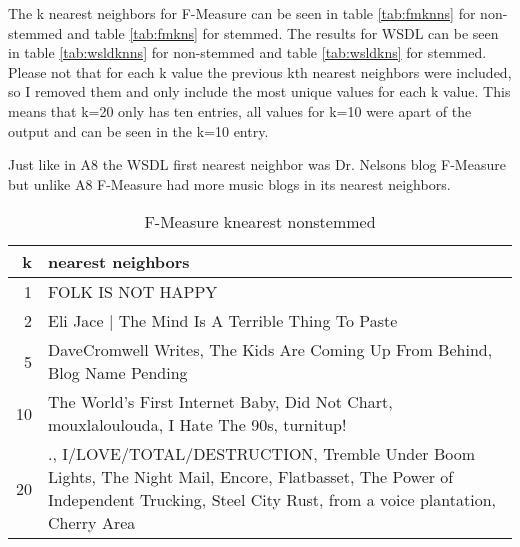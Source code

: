 \documentclass[letterpaper,10pt]{article}
\begin{document}
The k nearest neighbors for F-Measure can be seen in table \hyperref[tab:fmknns]{\ref{tab:fmknns}} for non-stemmed and table \hyperref[tab:fmkns]{\ref{tab:fmkns}} for stemmed. The results for WSDL can be seen in table \hyperref[tab:wsldknns]{\ref{tab:wsldknns}} for non-stemmed and table \hyperref[tab:wsldkns]{\ref{tab:wsldkns}} for stemmed. Please not that for each k value the previous kth nearest neighbors were included, so I removed them and only include the most unique values for each k value. This means that k=20 only has ten entries, all values for k=10 were apart of the output and can be seen in the k=10 entry.

Just like in A8 the WSDL first nearest neighbor was Dr. Nelsons blog F-Measure but unlike A8 F-Measure had more music blogs in its nearest neighbors.

\begin{table}[H]
\centering
\setlength\tabcolsep{2pt}
\begin{minipage}{0.48\textwidth}
\centering
\begin{tabular}{rp{5cm}}
\hline
   k & nearest neighbors                                                                                                                                                                    \\
\hline
   1 & FOLK IS NOT HAPPY                                                                                                                                                                    \\ \hline
   2 & Eli Jace | The Mind Is A Terrible Thing To Paste                                                                                                                                     \\ \hline
   5 & DaveCromwell Writes, The Kids Are Coming Up From Behind, Blog Name Pending                                                                                                           \\ \hline
  10 & The World's First Internet Baby, Did Not Chart, mouxlaloulouda, I Hate The 90s, turnitup!                                                                                            \\ \hline
  20 & ., I/LOVE/TOTAL/DESTRUCTION, Tremble Under Boom Lights, The Night Mail, Encore, Flatbasset, The Power of Independent Trucking, Steel City Rust, from a voice plantation, Cherry Area \\
\hline
\end{tabular}
\caption{F-Measure knearest nonstemmed}

\end{minipage}
\end{table}
\end{document}
